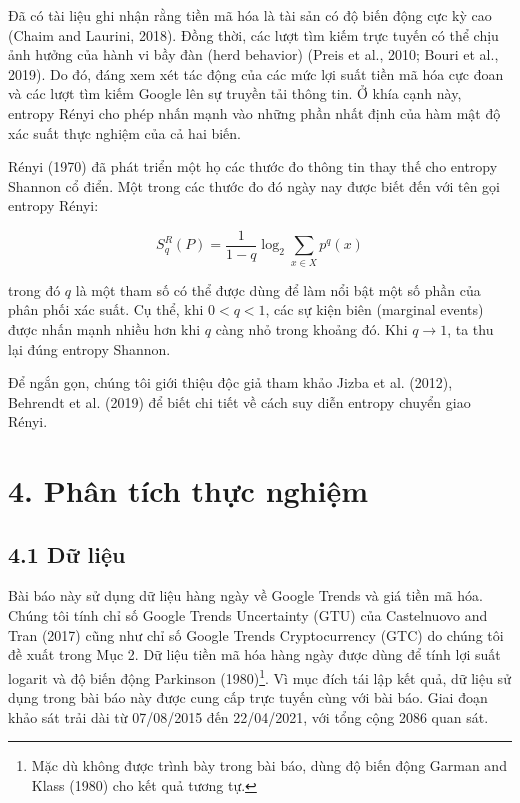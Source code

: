 Đã có tài liệu ghi nhận rằng tiền mã hóa là tài sản có độ biến động cực kỳ cao (Chaim and Laurini, 2018). Đồng thời, các lượt tìm kiếm trực tuyến có thể chịu ảnh hưởng của hành vi bầy đàn (herd behavior) (Preis et al., 2010; Bouri et al., 2019). Do đó, đáng xem xét tác động của các mức lợi suất tiền mã hóa cực đoan và các lượt tìm kiếm Google lên sự truyền tải thông tin. Ở khía cạnh này, entropy Rényi cho phép nhấn mạnh vào những phần nhất định của hàm mật độ xác suất thực nghiệm của cả hai biến.

Rényi (1970) đã phát triển một họ các thước đo thông tin thay thế cho entropy Shannon cổ điển. Một trong các thước đo đó ngày nay được biết đến với tên gọi entropy Rényi:

\begin{equation}
S_q^R(P) = \frac{1}{1-q}\log_2 \sum_{x\in X} p^q(x) \tag{3}
\end{equation}

trong đó $q$ là một tham số có thể được dùng để làm nổi bật một số phần của phân phối xác suất. Cụ thể, khi $0<q<1$, các sự kiện biên (marginal events) được nhấn mạnh nhiều hơn khi $q$ càng nhỏ trong khoảng đó. Khi $q\to 1$, ta thu lại đúng entropy Shannon.

Để ngắn gọn, chúng tôi giới thiệu độc giả tham khảo Jizba et al. (2012), Behrendt et al. (2019) để biết chi tiết về cách suy diễn entropy chuyển giao Rényi.

\section{4. Phân tích thực nghiệm}

\subsection*{4.1 Dữ liệu}

Bài báo này sử dụng dữ liệu hàng ngày về Google Trends và giá tiền mã hóa. Chúng tôi tính chỉ số Google Trends Uncertainty (GTU) của Castelnuovo and Tran (2017) cũng như chỉ số Google Trends Cryptocurrency (GTC) do chúng tôi đề xuất trong Mục 2. Dữ liệu tiền mã hóa hàng ngày được dùng để tính lợi suất logarit và độ biến động Parkinson (1980)\footnote{Mặc dù không được trình bày trong bài báo, dùng độ biến động Garman and Klass (1980) cho kết quả tương tự.}. Vì mục đích tái lập kết quả, dữ liệu sử dụng trong bài báo này được cung cấp trực tuyến cùng với bài báo. Giai đoạn khảo sát trải dài từ 07/08/2015 đến 22/04/2021, với tổng cộng 2086 quan sát.

